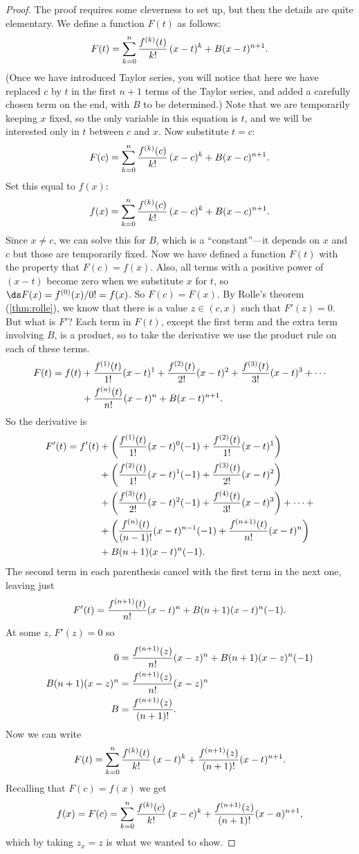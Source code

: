 \begin{proof}
The proof requires some cleverness to set up, but then the details are
quite elementary. We define a function $F(t)$ as follows:
$$F(t)=\sum_{k=0}^n{f^{(k)}(t)\over k!}\,(x-t)^k + B(x-t)^{n+1}.$$
(Once we have introduced Taylor series, you will notice that here we have replaced $c$ by $t$ in the first $n+1$ terms of the Taylor series, and added a carefully chosen term on the end, with $B$
to be determined.) Note that
we are temporarily keeping $x$ fixed, so the only variable in this
equation is $t$, and we will be interested
only in $t$ between $c$ and $x$. Now substitute $t=c$:
$$F(c)=\sum_{k=0}^n{f^{(k)}(c)\over k!}\,(x-c)^k + B(x-c)^{n+1}.$$
Set this equal to $f(x)$:
$$f(x)=\sum_{k=0}^n{f^{(k)}(c)\over k!}\,(x-c)^k + B(x-c)^{n+1}.$$
Since $x\not=c$, we can solve this for $B$, which is a
``constant''---it depends on $x$ and $c$ but those are temporarily 
fixed.  Now we
have defined a function $F(t)$ with the property that
$F(c)=f(x)$. Also, all terms with a positive power of
$(x-t)$ become zero when we substitute $x$ for $t$, so
$\ds F(x)=f^{(0)}(x)/0!=f(x)$. So $F(c)=F(x)$. 
By Rolle's theorem (\ref{thm:rolle}), we
know that there is a value $z\in(c,x)$ such that $F'(z)=0$. But what is $F'$?
Each term in $F(t)$, except the first term and the extra
term involving $B$, is a product, so to take the derivative we use the
product rule on each of these terms.
\begin{align*}
  F(t)=f(t)&+{f^{(1)}(t)\over 1!}(x-t)^1+{f^{(2)}(t)\over 2!}(x-t)^2+{f^{(3)}(t)\over 3!}(x-t)^3+\cdots	\\
  &+{f^{(n)}(t)\over n!}(x-t)^n+B(x-t)^{n+1}.
\end{align*}
So the derivative is
\begin{align*}
	  F'(t) = f'(t) &+\left({f^{(1)}(t)\over 1!}(x-t)^0(-1)+{f^{(2)}(t)\over 1!}(x-t)^1\right)	\\
  &+\left({f^{(2)}(t)\over 1!}(x-t)^1(-1)+{f^{(3)}(t)\over 2!}(x-t)^2\right)	\\
  &+\left({f^{(3)}(t)\over 2!}(x-t)^2(-1)+{f^{(4)}(t)\over 3!}(x-t)^3\right)+\dots+	\\
  &+\left({f^{(n)}(t)\over (n-1)!}(x-t)^{n-1}(-1)+{f^{(n+1)}(t)\over n!}(x-t)^n\right)	\\
  &+B(n+1)(x-t)^n(-1).
\end{align*}
The second term in each parenthesis cancel with the first term in the next one,
leaving just
$$F'(t) = {f^{(n+1)}(t)\over n!}(x-t)^n+B(n+1)(x-t)^n(-1).$$
At some $z$, $F'(z)=0$ so
\begin{align*}
  0&={f^{(n+1)}(z)\over n!}(x-z)^n+B(n+1)(x-z)^n(-1)	\\
  B(n+1)(x-z)^n&={f^{(n+1)}(z)\over n!}(x-z)^n	\\
  B&={f^{(n+1)}(z)\over (n+1)!}.
\end{align*}
Now we can write 
$$
  F(t)=\sum_{k=0}^n{f^{(k)}(t)\over k!}\,(x-t)^k + 
  {f^{(n+1)}(z)\over (n+1)!}(x-t)^{n+1}.
$$
Recalling that $F(c)=f(x)$ we get
$$
  f(x)=F(c)=\sum_{k=0}^n{f^{(k)}(c)\over k!}\,(x-c)^k + 
  {f^{(n+1)}(z)\over (n+1)!}(x-a)^{n+1},
$$
which by taking $ z_x=z $ is what we wanted to show.
\end{proof}


